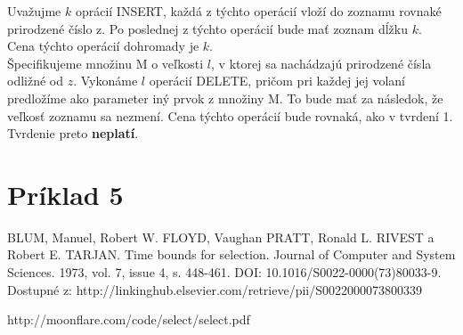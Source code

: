 \documentclass[paper=a4, fontsize=11pt]{scrartcl} %
\numberwithin{equation}{section} %
\numberwithin{figure}{section} %
\numberwithin{table}{section} %
\begin{document}
Uvažujme $k$ oprácií INSERT, každá z týchto operácií vloží do zoznamu rovnaké prirodzené číslo z.
Po poslednej z týchto operácií bude mať zoznam dĺžku $k$. \\

Cena týchto operácií dohromady je $k$. \\

Špecifikujeme množinu M o veľkosti $l$, v ktorej sa nachádzajú prirodzené čísla odližné od $z$.
Vykonáme $l$ operácií DELETE, pričom pri každej jej volaní predložíme ako parameter iný prvok z množiny M.
To bude mať za následok, že veľkosť zoznamu sa nezmení. Cena týchto operácií bude rovnaká, ako v tvrdení 1.
Tvrdenie preto \textbf{neplatí}.





\pagebreak

\section*{Príklad 5}
\begin{thebibliography}{1}
 BLUM, Manuel, Robert W. FLOYD, Vaughan PRATT, Ronald L. RIVEST a Robert E. TARJAN.
Time bounds for selection.
Journal of Computer and System Sciences. 1973, vol. 7, issue 4, s. 448-461.
DOI: 10.1016/S0022-0000(73)80033-9.
Dostupné z: http://linkinghub.elsevier.com/retrieve/pii/S0022000073800339

 http://moonflare.com/code/select/select.pdf
\end{thebibliography}
\end{document}
